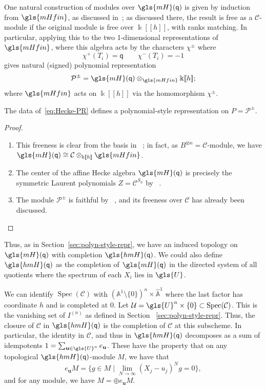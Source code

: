 \documentclass[ALCO,ThmDefs,Unicode,epreuves]{cedram}
\DeclareMathOperator{\Spec}{Spec}
\newcommand{\pq}{\mathsf{q}}
\newcommand{\K}{\Bbbk}%
\newcommand{\Bu}{\mathbf{u}}
\newcommand{\cP}{\mathcal{P}}
\newcommand{\mH}{\gls{mH}}
\newcommand{\hmH}{\gls{hmH}}
\newcommand\llbracket{[\![}
\newcommand\rrbracket{]\!]}
\begin{document}
One natural construction of modules over $\gls{mH}(\pq)$ is given by
induction from $\gls{mHfin} $, as discussed in~\cite[\S~4.3]{MacHecke}; as discussed there, the result is free as a
$\mathcal{C}$-module if the original module is free over $\K\llbracket h\rrbracket $,
with ranks matching. In particular, applying this to the two 1-dimensional
representations of $\gls{mHfin}$, where this algebra acts by the
characters $\chi^\pm$ where
\[ \chi^+(T_i)=\pq\qquad \chi^-(T_i)=-1\] gives natural (signed) polynomial
representation \[\cP^\pm=\gls{mH}(\pq)\otimes_{\gls{mHfin}}\K\llbracket h\rrbracket ;\] where
$\gls{mHfin}$ acts on $\K\llbracket h\rrbracket $ via the homomorphism $\chi^\pm$.
\begin{lemma}
 The data of~\eqref{eq:Hecke-PR} defines a polynomial-style
 representation on $P=\cP^{\pm}$. 
\end{lemma}
\begin{proof}\mbox{}
 \begin{enumerate}
 \item This freeness is clear from the basis in
~\cite[4.3]{MacBourbaki}; in fact, as
 $B^{\otimes n}=\mathcal{C}$-module, we have
 $\gls{mH}(\pq)\cong \mathcal{C}\otimes_{\K\llbracket h\rrbracket }\gls{mHfin} $. 
 \item The center of the affine Hecke algebra $\gls{mH}(\pq)$ is precisely
 the symmetric Laurent polynomials $Z=\mathcal{C}^{S_n}$ by
~\cite[4.5]{MacBourbaki}.
 \item The module $\cP^{\pm}$ is faithful by
~\cite[(4.3.10)]{MacHecke}, and its freeness over $\mathcal{C}$
 has already been discussed.\qedhere
 \end{enumerate}
\end{proof}


Thus, as in Section~\ref{sec:polyn-style-repr}, we have an induced
topology on $\mH(\pq)$ with completion $\hmH(\pq)$. We could also
define $\hmH(\pq)$ as the completion of
$\gls{mH}(\pq)$ in the directed system of all quotients where the spectrum of
each $X_i$ lies in $\gls{U}$. 

We can
identify $\Spec(\mathcal{C})$ with $(\mathbb{A}^1\setminus
\{0\})^n\times \widehat{\mathbb{A}}^1$ where the last factor has coordinate
$h$ and is completed at $0$. 
 Let $\mathcal{U}=\gls{U}^n\times \{0\}\subset \Spec(\mathcal{C})$. This
 is the vanishing set of $I^{(n)}$ as defined in Section
~\ref{sec:polyn-style-repr}. Thus, the closure of $\mathcal{C}$ in
 $\hmH(\pq)$ is the completion of $\mathcal{C}$ at this subscheme. In
 particular, the identity in $\mathcal{C}$, and thus in $\hmH(\pq)$
 decomposes as a sum of idempotents $1=\sum_{\Bu\in \gls{U}^n}e_{\Bu}$. These have the
 property that on any topological $\hmH(\pq)$-module $M$, we have that 
\[e_{\Bu}M=\{ g\in M \mid\lim_{N\to \infty}
 (X_j-{u_j})^Ng=0\},\]
and for any module, we have $M=\oplus e_{\Bu}M$. 
\end{document}
